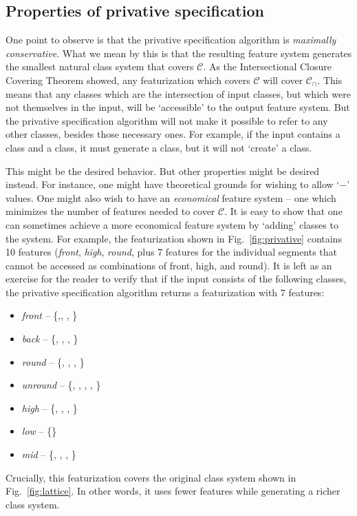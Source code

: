 \documentclass[11pt, oneside]{article}   	%
\begin{document}
\subsection{Properties of privative specification}

One point to observe is that the privative specification algorithm is \textit{maximally conservative}. What we mean by this is that the resulting feature system generates the smallest natural class system that covers $\mathcal C$. As the Intersectional Closure Covering Theorem showed, any featurization which covers $\mathcal C$ will cover $\mathcal C_\cap$. This means that any classes which are the intersection of input classes, but which were not themselves in the input, will be `accessible' to the output feature system. But the privative specification algorithm will not make it possible to refer to any other classes, besides those necessary ones. For example, if the input contains a  class and a  class, it must generate a  class, but it will not `create' a  class.

This might be the desired behavior. But other properties might be desired instead. For instance, one might have theoretical grounds for wishing to allow `$-$' values. One might also wish to have an \textit{economical} feature system -- one which minimizes the number of features needed to cover $\mathcal C$. It is easy to show that one can sometimes achieve a more economical  feature system by `adding' classes to the system. For example, the featurization shown in Fig.~\ref{fig:privative} contains 10 features (\textit{front}, \textit{high}, \textit{round}, plus 7 features for the individual segments that cannot be accessed as combinations of front, high, and round). It is left as an exercise for the reader to verify that if the input consists of the following classes, the privative specification algorithm returns a featurization with 7 features: \begin{itemize}
    \item \textit{front} -- \{,, , \textipa{\oe}\}
    \item \textit{back} -- \{, , , \}
    \item \textit{round} -- \{, , \textipa{\oe}, \}
    \item \textit{unround} --  \{, , , , \}
    \item \textit{high} --  \{, , , \}
    \item \textit{low} -- \{\}
    \item \textit{mid} --  \{, \textipa{\oe}, , \}
    \end{itemize}
Crucially, this featurization covers the original class system shown in Fig.~\ref{fig:lattice}. In other words, it uses fewer features while generating a richer class system.
\end{document}
